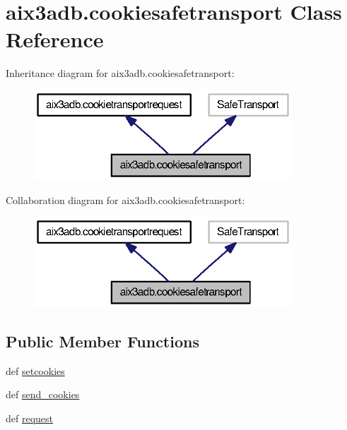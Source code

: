 \section{aix3adb.\-cookiesafetransport Class Reference}
\label{classaix3adb_1_1cookiesafetransport}


Inheritance diagram for aix3adb.\-cookiesafetransport\-:
\nopagebreak
\begin{figure}[H]
\begin{center}
\leavevmode
\includegraphics[width=274pt]{classaix3adb_1_1cookiesafetransport__inherit__graph}
\end{center}
\end{figure}


Collaboration diagram for aix3adb.\-cookiesafetransport\-:
\nopagebreak
\begin{figure}[H]
\begin{center}
\leavevmode
\includegraphics[width=274pt]{classaix3adb_1_1cookiesafetransport__coll__graph}
\end{center}
\end{figure}
\subsection*{Public Member Functions}
\begin{DoxyCompactItemize}
\item 
def \hyperlink{classaix3adb_1_1cookietransportrequest_abe6fadeb9e155d3c411054a107b09a80}{setcookies}
\item 
def \hyperlink{classaix3adb_1_1cookietransportrequest_aea3312026b80bf1f9245bac8c99e13d7}{send\-\_\-cookies}
\item 
def \hyperlink{classaix3adb_1_1cookietransportrequest_ad6b074fd05e772950428b808e9fd789e}{request}
\end{DoxyCompactItemize}
